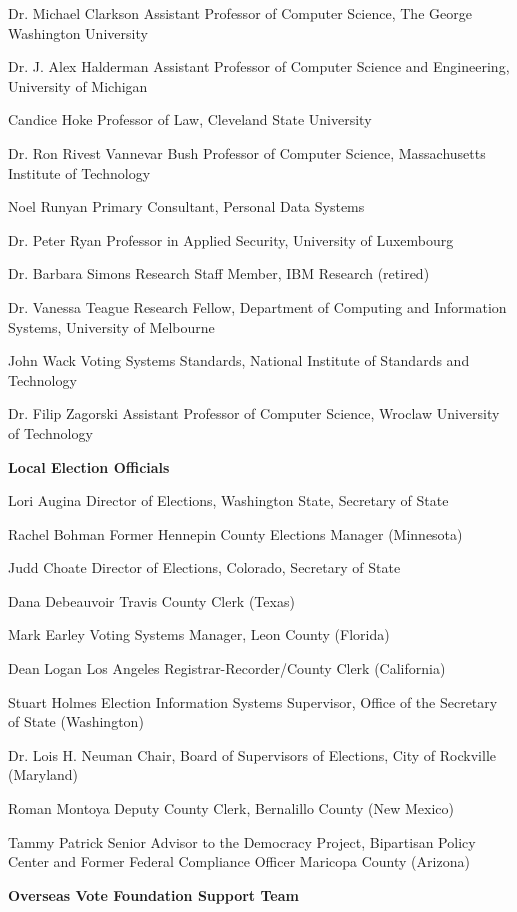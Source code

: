 Dr. Michael Clarkson
Assistant Professor of Computer Science, The George Washington University
 
Dr. J. Alex Halderman
Assistant Professor of Computer Science and Engineering, University of Michigan
 
Candice Hoke
Professor of Law, Cleveland State University
 
Dr. Ron Rivest
Vannevar Bush Professor of Computer Science, Massachusetts Institute of Technology
 
Noel Runyan
Primary Consultant, Personal Data Systems
 
Dr. Peter Ryan
Professor in Applied Security, University of Luxembourg
 
Dr. Barbara Simons
Research Staff Member, IBM Research (retired)
 
Dr. Vanessa Teague
Research Fellow, Department of Computing and Information Systems, University of Melbourne
 
John Wack
Voting Systems Standards, National Institute of Standards and Technology
 
Dr. Filip Zagorski
Assistant Professor of Computer Science, Wroclaw University of Technology
 
\textbf{Local Election Officials}

Lori Augina
Director of Elections, Washington State, Secretary of State

Rachel Bohman
Former Hennepin County Elections Manager (Minnesota)

Judd Choate
Director of Elections, Colorado, Secretary of State

Dana Debeauvoir
Travis County Clerk (Texas)
 
Mark Earley
Voting Systems Manager, Leon County (Florida)
 
Dean Logan
Los Angeles Registrar-Recorder/County Clerk (California)

Stuart Holmes
Election Information Systems Supervisor, Office of the Secretary of State (Washington)
 
Dr. Lois H. Neuman
Chair, Board of Supervisors of Elections, City of Rockville (Maryland)
 
Roman Montoya
Deputy County Clerk, Bernalillo County (New Mexico)
 
Tammy Patrick
Senior Advisor to the Democracy Project, Bipartisan Policy Center and Former Federal Compliance Officer Maricopa County (Arizona)
 
\textbf{Overseas Vote Foundation Support Team}

